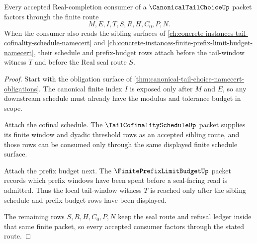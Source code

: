 \begin{theorem}
\label{thm:canonical-tail-choice-schedule-factorization}
Every accepted Real-completion consumer of a $\CanonicalTailChoiceUp$ packet factors through the finite route
$$
M,E,I,T,S,R,H,C_0,P,N.
$$
When the consumer also reads the sibling surfaces of \autoref{ch:concrete-instances-tail-cofinality-schedule-namecert} and \autoref{ch:concrete-instances-finite-prefix-limit-budget-namecert}, their schedule and prefix-budget rows attach before the tail-window witness $T$ and before the Real seal route $S$.
\end{theorem}
\begin{proof}
Start with the obligation surface of \autoref{thm:canonical-tail-choice-namecert-obligations}. The canonical finite index $I$ is exposed only after $M$ and $E$, so any downstream schedule must already have the modulus and tolerance budget in scope.

Attach the cofinal schedule. The $\TailCofinalityScheduleUp$ packet supplies its finite window and dyadic threshold rows as an accepted sibling route, and those rows can be consumed only through the same displayed finite schedule surface.

Attach the prefix budget next. The $\FinitePrefixLimitBudgetUp$ packet records which prefix windows have been spent before a seal-facing read is admitted. Thus the local tail-window witness $T$ is reached only after the sibling schedule and prefix-budget rows have been displayed.

The remaining rows $S,R,H,C_0,P,N$ keep the seal route and refusal ledger inside that same finite packet, so every accepted consumer factors through the stated route.
\end{proof}

